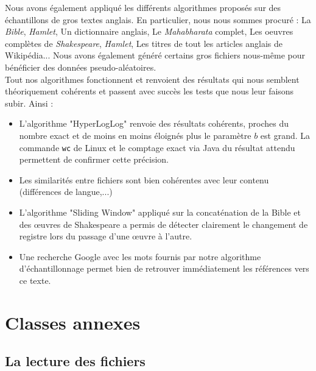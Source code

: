 \documentclass[12pt,a4paper,titlepage]{article}
\newcommand{\class}[1]{\texttt{#1}}
\begin{document}
Nous avons également appliqué les différents algorithmes proposés sur des échantillons de gros textes anglais. En particulier, nous nous sommes procuré : La \textit{Bible}, \textit{Hamlet}, Un dictionnaire anglais, Le \textit{Mahabharata} complet, Les oeuvres complètes de \textit{Shakespeare}, \textit{Hamlet}, Les titres de tout les articles anglais de Wikipédia... Nous avons également généré certains gros fichiers nous-même pour bénéficier des données pseudo-aléatoires.\\

Tout nos algorithmes fonctionnent et renvoient des résultats qui nous semblent théoriquement cohérents et passent avec succès les tests que nous leur faisons subir. Ainsi :
\begin{itemize}
\item L'algorithme "HyperLogLog" renvoie des résultats cohérents, proches du nombre exact et de moins en moins éloignés plus le paramètre $b$ est grand.
La commande \class{wc} de Linux et le comptage exact via Java du résultat attendu permettent de confirmer cette précision.
\item Les similarités entre fichiers sont bien cohérentes avec leur contenu (différences de langue,...)
\item L'algorithme "Sliding Window" appliqué sur la concaténation de la Bible et des œuvres de Shakespeare a permis de détecter clairement le changement de registre lors du passage d'une œuvre à l'autre.
\item Une recherche Google avec les mots fournis par notre algorithme d'échantillonnage permet bien de retrouver immédiatement les références vers ce texte.
\end{itemize}

\newpage
\section*{Classes annexes}

\subsection*{La lecture des fichiers}
\end{document}
